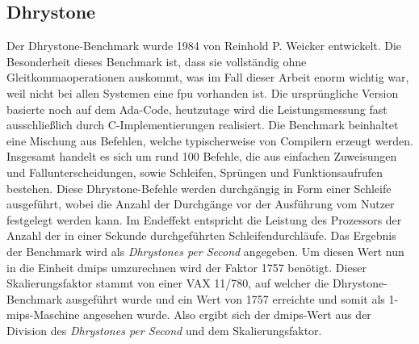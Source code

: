 \subsection{Dhrystone}\label{kap:dhrystone}
Der Dhrystone-Benchmark wurde 1984 von Reinhold P. Weicker entwickelt. Die Besonderheit dieses Benchmark ist, dass sie vollständig
ohne Gleitkommaoperationen auskommt, was im Fall dieser Arbeit enorm wichtig war, weil nicht bei allen Systemen eine \ac{fpu} vorhanden ist.
Die ursprüngliche Version basierte noch auf dem Ada-Code, heutzutage wird die Leistungsmessung fast ausschließlich durch C-Implementierungen
 realisiert. Die Benchmark beinhaltet eine Mischung aus Befehlen, welche typischerweise von Compilern erzeugt werden. Insgesamt handelt es sich
 um rund 100 Befehle, die aus einfachen Zuweisungen und Fallunterscheidungen, sowie Schleifen, Sprüngen und Funktionsaufrufen bestehen.
  Diese Dhrystone-Befehle werden durchgängig in Form einer Schleife ausgeführt, wobei die Anzahl der Durchgänge vor der Ausführung vom
  Nutzer festgelegt werden kann. Im Endeffekt entspricht die Leistung des Prozessors der Anzahl der in einer Sekunde durchgeführten Schleifendurchläufe.
  Das Ergebnis der Benchmark wird als \emph{Dhrystones per Second} angegeben. Um diesen Wert nun in die Einheit \ac{dmips} umzurechnen wird der Faktor 1757 benötigt. Dieser Skalierungsfaktor
  stammt von einer VAX 11/780, auf welcher die Dhrystone-Benchmark ausgeführt wurde und ein Wert von 1757 erreichte und somit als 1-\ac{mips}-Maschine angesehen wurde. Also ergibt sich der
  \ac{dmips}-Wert aus der Division des \emph{Dhrystones per Second} und dem Skalierungsfaktor.~\cite{benchmark}

